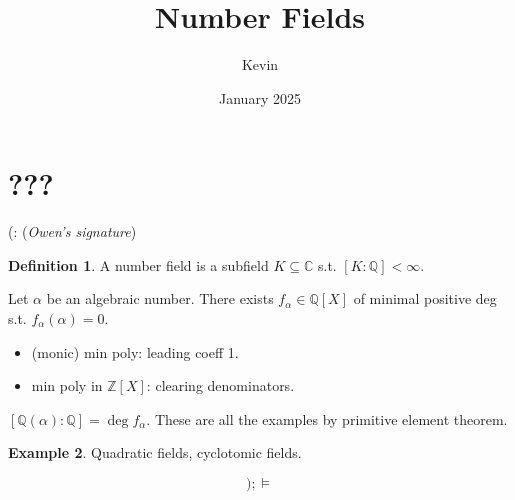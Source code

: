 \documentclass{article}
\title{Number Fields}
\author{Kevin}
\date{January 2025}
\theoremstyle{definition}
\newtheorem{defn}{Definition}[section]
\newtheorem{example}[defn]{Example}
\theoremstyle{remark}
\theoremstyle{plain}
\newcommand{\ZZ}{\mathbb{Z}}
\newcommand{\QQ}{\mathbb{Q}}
\newcommand{\CC}{\mathbb{C}}
\begin{document}
\maketitle
\section{???}
(: (\textit{Owen's signature})




\begin{defn}
    A number field is a subfield $K\subseteq \CC$ s.t. $[K:\QQ]<\infty$.
\end{defn}
Let $\alpha$ be an algebraic number. There exists $f_\alpha\in\QQ[X]$ of minimal positive deg s.t. $f_\alpha(\alpha)=0$. 
\begin{itemize}
    \item (monic) min poly: leading coeff 1.
    \item min poly in $\ZZ[X]$: clearing denominators.
\end{itemize}
$[\QQ(\alpha):\QQ]=\deg f_\alpha$. These are all the examples by primitive element theorem.
\begin{example}
    Quadratic fields, cyclotomic fields. 
\end{example}

\[);\models\tag{Owen's Signature}\]
\end{document}
